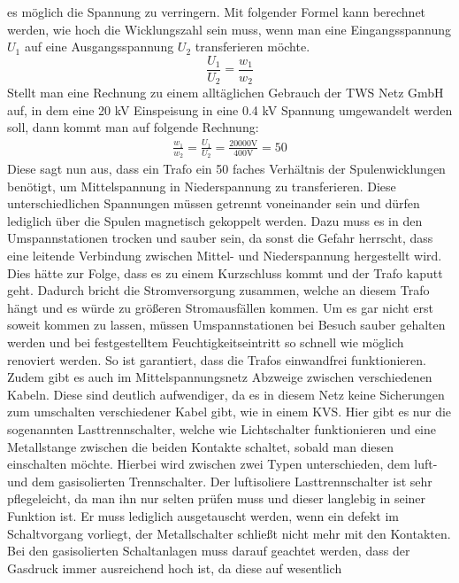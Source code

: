 es möglich die Spannung zu verringern. Mit folgender Formel kann berechnet werden, wie hoch die Wicklungszahl sein muss, wenn man \zB eine 
Eingangsspannung $U_1$ auf eine Ausgangsspannung $U_2$ transferieren möchte. 
\begin{equation}
\frac{U_1}{U_2}=\frac{w_1}{w_2}
\label{eqn:Trafo Wicklungszahl}
\end{equation}
Stellt man eine Rechnung zu einem alltäglichen Gebrauch der TWS Netz GmbH auf, in dem eine 20 kV Einspeisung in eine 0.4 kV Spannung umgewandelt werden 
soll, dann kommt man auf folgende Rechnung:
\begin{eqnarray}
\frac{w_1}{w_2}=\frac{U_1}{U_2}=\frac{20000\text{V}}{400\text{V}}=50
\label{eqn:Beispiel Wicklungen}
\end{eqnarray}
Diese sagt nun aus, dass ein Trafo ein 50 faches Verhältnis der Spulenwicklungen benötigt, um Mittelspannung in Niederspannung zu transferieren. Diese 
unterschiedlichen Spannungen müssen getrennt voneinander sein und dürfen lediglich über die Spulen magnetisch gekoppelt werden. Dazu muss es in den 
Umspannstationen trocken und sauber sein, da sonst die Gefahr herrscht, dass eine leitende Verbindung zwischen Mittel- und Niederspannung hergestellt 
wird. Dies hätte zur Folge, dass es zu einem Kurzschluss kommt und der Trafo kaputt geht. Dadurch bricht die Stromversorgung zusammen, welche an diesem 
Trafo hängt und es würde zu größeren Stromausfällen kommen. Um es gar nicht erst soweit kommen zu lassen, müssen Umspannstationen bei Besuch sauber 
gehalten werden und bei festgestelltem Feuchtigkeitseintritt so schnell wie möglich renoviert werden. So ist garantiert, dass die Trafos einwandfrei 
funktionieren.\\
Zudem gibt es auch im Mittelspannungsnetz Abzweige zwischen verschiedenen Kabeln. Diese sind deutlich aufwendiger, da es in diesem Netz keine Sicherungen 
zum umschalten verschiedener Kabel gibt, wie in einem KVS. Hier gibt es nur die sogenannten Lasttrennschalter, welche wie Lichtschalter funktionieren und
eine Metallstange zwischen die beiden Kontakte schaltet, sobald man diesen einschalten möchte. Hierbei wird zwischen zwei Typen unterschieden, dem luft-
und dem gasisolierten Trennschalter. Der luftisoliere Lasttrennschalter ist sehr pflegeleicht, da man ihn nur selten prüfen muss und dieser langlebig 
in seiner Funktion ist. Er muss lediglich ausgetauscht werden, wenn ein defekt im Schaltvorgang vorliegt, \zB der Metallschalter schließt nicht mehr mit
den Kontakten. Bei den gasisolierten Schaltanlagen muss darauf geachtet werden, dass der Gasdruck immer ausreichend hoch ist, da diese auf wesentlich 
